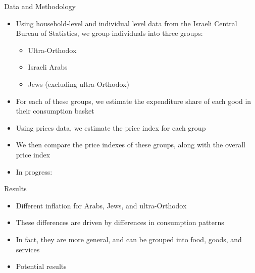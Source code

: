 \documentclass[10pt]{beamer}
\begin{document}
\begin{frame}
	{Data and Methodology}
	\begin{itemize}
		\item Using household-level and individual level data from the Israeli Central Bureau of Statistics, we group individuals into three groups:
		      \begin{itemize}
			      \item Ultra-Orthodox
			      \item Israeli Arabs
			      \item Jews (excluding ultra-Orthodox)
		      \end{itemize}
		\item For each of these groups, we estimate the expenditure share of each good in their consumption basket
		\item Using prices data, we estimate the price index for each group
		\item We then compare the price indexes of these groups, along with the overall price index
		\item In progress:
	\end{itemize}
\end{frame}
\begin{frame}
	{Results}
	\begin{itemize}
		\item Different inflation for Arabs, Jews, and ultra-Orthodox
		\item These differences are driven by differences in consumption patterns
		\item In fact, they are more general, and can be grouped into food, goods, and services
		\item Potential results
	\end{itemize}
\end{frame}
\end{document}
